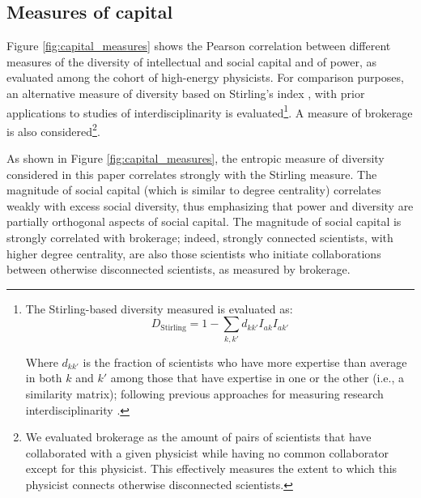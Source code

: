 \documentclass{article}
\begin{document}
\subsection{\label{appendix:capital_validation}Measures of capital}



Figure \ref{fig:capital_measures} shows the Pearson correlation between different measures of the diversity of intellectual and social capital and of power, as evaluated among the cohort of high-energy physicists. For comparison purposes, an alternative measure of diversity based on Stirling's index \citep{Stirling2007}, with prior applications to studies of interdisciplinarity \citep{Porter2007,Leahey2016} is evaluated\footnote{The Stirling-based diversity measured is evaluated as: \begin{equation}
    D_{\text{Stirling}} = 1-\sum_{k,k'}d_{kk'}I_{ak}I_{ak'}
\end{equation}

Where $d_{kk'}$ is the fraction of scientists who have more expertise than average in both $k$ and $k'$ among those that have expertise in one or the other (i.e., a similarity matrix); following previous approaches for measuring research interdisciplinarity \citealt{Porter2007,Leahey2016}.}. A measure of brokerage is also considered\footnote{We evaluated brokerage as the amount of pairs of scientists that have collaborated with a given physicist while having no common collaborator except for this physicist. This effectively measures the extent to which this physicist connects otherwise disconnected scientists.}. 

As shown in Figure \ref{fig:capital_measures}, the entropic measure of diversity considered in this paper correlates strongly with the Stirling measure. The magnitude of social capital (which is similar to degree centrality) correlates weakly with excess social diversity, thus emphasizing that power and diversity are partially orthogonal aspects of social capital. The magnitude of social capital is strongly correlated with brokerage; indeed, strongly connected scientists, with higher degree centrality, are also those scientists who initiate collaborations between otherwise disconnected scientists, as measured by brokerage.
\end{document}
